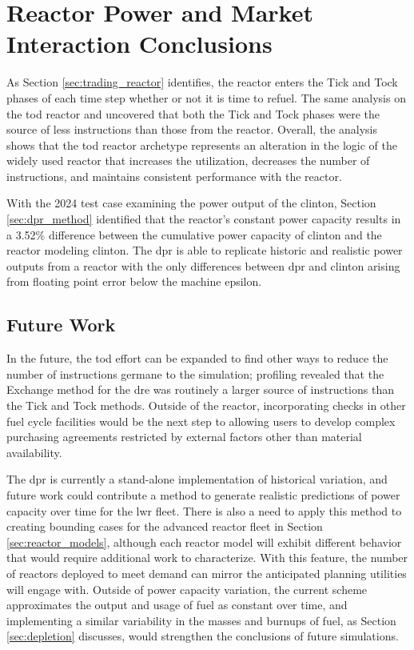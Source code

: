 \section{Reactor Power and Market Interaction Conclusions}

As Section \ref{sec:trading_reactor} identifies, the \cycamore reactor enters the Tick and Tock phases of each time step whether or not it is time to refuel. The same analysis on the \gls{tod} reactor and uncovered that both the Tick and Tock phases were the source of less instructions than those from the \cycamore reactor. Overall, the analysis shows that the \gls{tod} reactor archetype represents an alteration in the logic of the widely used \cycamore reactor that increases the utilization, decreases the number of instructions, and maintains consistent performance with the \cycamore reactor.

With the 2024 test case examining the power output of the \gls{clinton}, Section \ref{sec:dpr_method} identified that the \cycamore reactor's constant power capacity results in a 3.52\% difference between the cumulative power capacity of \gls{clinton} and the \cycamore reactor modeling \gls{clinton}. The \gls{dpr} is able to replicate historic and realistic power outputs from a reactor with the only differences between \gls{dpr} and \gls{clinton} arising from floating point error below the machine epsilon.

\subsection{Future Work}
\label{sec:time_future_work}

In the future, the \gls{tod} effort can be expanded to find other ways to reduce the number of instructions germane to the simulation; profiling revealed that the Exchange method for the \gls{dre} was routinely a larger source of instructions than the Tick and Tock methods. Outside of the reactor, incorporating checks in other fuel cycle facilities would be the next step to allowing users to develop complex purchasing agreements restricted by external factors other than material availability.

The \gls{dpr} is currently a stand-alone implementation of historical variation, and future work could contribute a method to generate realistic predictions of power capacity over time for the \gls{lwr} fleet. There is also a need to apply this method to creating bounding cases for the advanced reactor fleet in Section \ref{sec:reactor_models}, although each reactor model will exhibit different behavior that would require additional work to characterize. With this feature, the number of reactors deployed to meet demand can mirror the anticipated planning utilities will engage with. Outside of power capacity variation, the current scheme approximates the output and usage of fuel as constant over time, and implementing a similar variability in the masses and burnups of fuel, as Section \ref{sec:depletion} discusses, would strengthen the conclusions of future \cyclus simulations.


